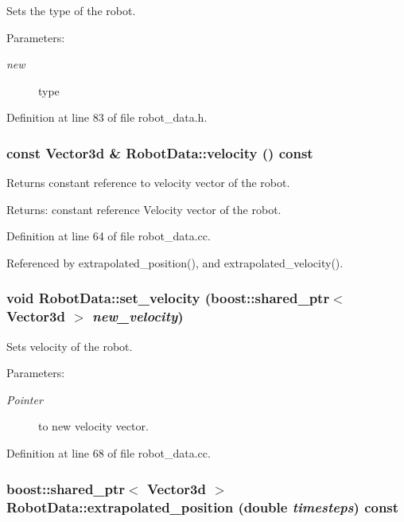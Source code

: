 Sets the type of the robot. \begin{Desc}
\item[Parameters:]
\begin{description}
\item[{\em new}]type \end{description}
\end{Desc}


Definition at line 83 of file robot\_\-data.h.\hypertarget{class_robot_data_933da54224245d40afb0ed1b2446599c}{
\subsubsection[velocity]{\setlength{\rightskip}{0pt plus 5cm}const Vector3d \& RobotData::velocity () const}}
\label{class_robot_data_933da54224245d40afb0ed1b2446599c}


Returns constant reference to velocity vector of the robot. \begin{Desc}
\item[Returns:]constant reference Velocity vector of the robot. \end{Desc}


Definition at line 64 of file robot\_\-data.cc.

Referenced by extrapolated\_\-position(), and extrapolated\_\-velocity().\hypertarget{class_robot_data_4a45b387b65f7924015075bdcea2b00a}{
\subsubsection[set\_\-velocity]{\setlength{\rightskip}{0pt plus 5cm}void RobotData::set\_\-velocity (boost::shared\_\-ptr$<$ Vector3d $>$ {\em new\_\-velocity})}}
\label{class_robot_data_4a45b387b65f7924015075bdcea2b00a}


Sets velocity of the robot. \begin{Desc}
\item[Parameters:]
\begin{description}
\item[{\em Pointer}]to new velocity vector. \end{description}
\end{Desc}


Definition at line 68 of file robot\_\-data.cc.\hypertarget{class_robot_data_5604cb6b35b70e6d70da6429349eec65}{
\subsubsection[extrapolated\_\-position]{\setlength{\rightskip}{0pt plus 5cm}boost::shared\_\-ptr$<$ Vector3d $>$ RobotData::extrapolated\_\-position (double {\em timesteps}) const}}
\label{class_robot_data_5604cb6b35b70e6d70da6429349eec65}


